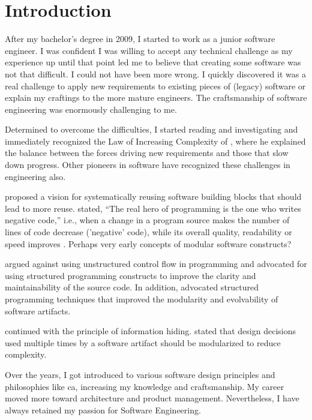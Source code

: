 \chapter{Introduction} \label{chap_introduction}

After my bachelor's degree in 2009, I started to work as a junior software engineer. I was
confident I was willing to accept any technical challenge as my experience up until that
point led me to believe that creating some software was not that difficult. I could not
have been more wrong. I quickly discovered it was a real challenge to apply new
requirements to existing pieces of (legacy) software or explain my craftings to the more
mature engineers. The craftsmanship of software engineering was enormously challenging to
me.

Determined to overcome the difficulties, I started reading and investigating and
immediately recognized the Law of Increasing Complexity of
\textcite{lehman_programs_1980}, where he explained the balance between the forces driving
new requirements and those that slow down progress. Other pioneers in software have
recognized these challenges in engineering also.


\textcite{d_mcilroy_nato_1968} proposed a vision for systematically reusing software building
blocks that should lead to more reuse. \textcite{d_mcilroy_nato_1968} stated, \enquote{The real
hero of programming is the one who writes negative code,} i.e., when a change in a program
source makes the number of lines of code decrease ('negative' code), while its overall
quality, readability or speed improves \parencite{wikipedia_douglas_2023}. Perhaps very
early concepts of modular software constructs?

\textcite{dijkstra_letters_1968} argued against using unstructured control flow in
programming and advocated for using structured programming constructs to improve the
clarity and maintainability of the source code. In addition,
 advocated structured programming techniques that
improved the modularity and evolvability of software artifacts.

\textcite{parnas_criteria_1972} continued with the principle of information hiding.
 stated that design decisions used multiple times by a
software artifact should be modularized to reduce complexity. 

Over the years, I got introduced to various software design principles and philosophies
like \gls{ca}, increasing my knowledge and craftsmanship. My career moved more toward
architecture and product management. Nevertheless, I have always retained my passion for
Software Engineering.

